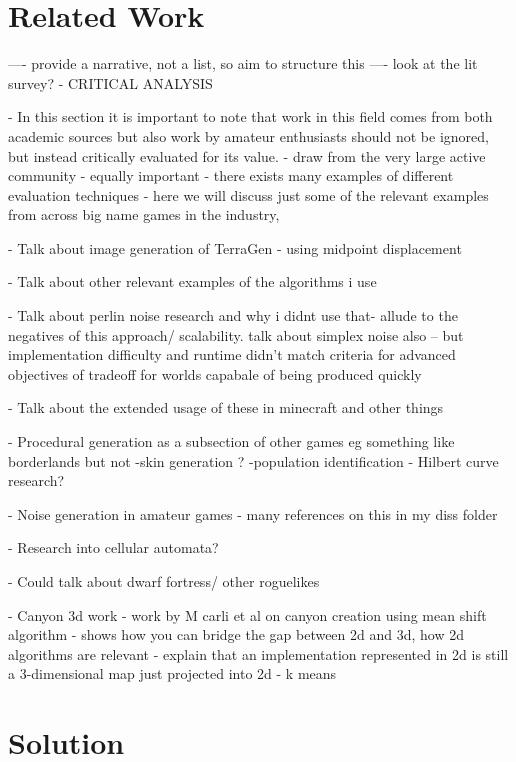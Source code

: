 \documentclass[12pt,a4paper]{article}
\begin{document}
\section{Related Work}

---- provide a narrative, not a list, so aim to structure this 
---- look at the lit survey? 
- CRITICAL ANALYSIS

- In this section it is important to note that work in this field comes from both academic sources but also work by amateur enthusiasts should not be ignored, but instead critically evaluated for its value. 
- draw from the very large active community 
- equally important 
- there exists many examples of different evaluation techniques 
- here we will discuss just some of the relevant examples from across big name games in the industry, 


- Talk about image generation of TerraGen - using midpoint displacement 

- Talk about other relevant examples of the algorithms i use

- Talk about perlin noise research and why i didnt use that- allude to the negatives of this approach/ scalability. talk about simplex noise also
	-- but implementation difficulty and runtime didn't match criteria for advanced objectives of tradeoff for worlds capabale of being produced quickly  


- Talk about the extended usage of these in minecraft and other things 

- Procedural generation as a subsection of other games eg something like borderlands but not
			-skin generation ?
			-population identification 
- Hilbert curve research? 

- Noise generation in amateur games - many references on this in my diss folder 

- Research into cellular automata? 

- Could talk about dwarf fortress/ other roguelikes 

- Canyon 3d work 
	- work by M carli et al on canyon creation using mean shift algorithm 
	- shows how you can bridge the gap between 2d and 3d, how 2d algorithms are relevant
	- explain that an implementation represented in 2d is still a 3-dimensional map just projected into 2d
	- k means 


\section{Solution} 
\label{solutions}
\end{document}

